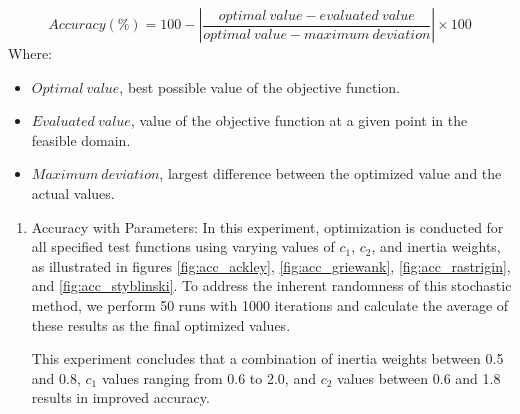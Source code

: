 \documentclass[paper,revised]{geophysics}
\begin{document}
\begin{equation}
	Accuracy (\%) = 100 - \left| \frac{optimal \ value - evaluated \ value}{optimal \ value - maximum \ deviation} \right| \times 100
	\label{eqn:accuracy}
\end{equation}
Where:
\begin{itemize}
	\item \(Optimal \  value\), best possible value of the objective function.
	\item \(Evaluated \ value\), value of the objective function at a given point in the feasible domain.
	\item \(Maximum \ deviation\), largest difference between the optimized value and the actual values.
\end{itemize}
\begin{enumerate}
	\item Accuracy with Parameters: In this experiment, optimization is conducted for all specified test functions using varying values of \(c_1\), \(c_2\), and inertia weights, as illustrated in figures \ref{fig:acc_ackley}, \ref{fig:acc_griewank}, \ref{fig:acc_rastrigin}, and \ref{fig:acc_styblinski}. To address the inherent randomness of this stochastic method, we perform 50 runs with 1000 iterations and calculate the average of these results as the final optimized values. 
	
This experiment concludes that a combination of inertia weights between 0.5 and 0.8, \(c_1\) values ranging from 0.6 to 2.0, and \(c_2\) values between 0.6 and 1.8 results in improved accuracy. 


\end{enumerate}
\end{document}
